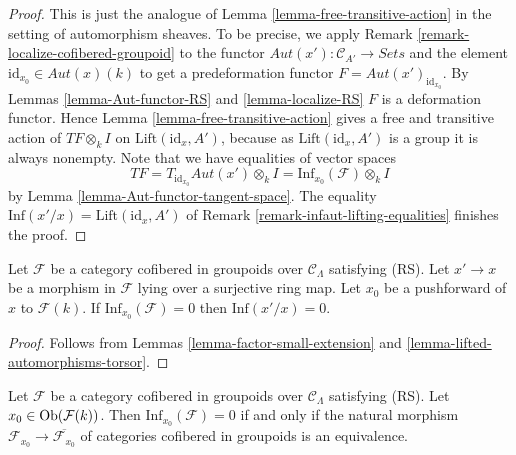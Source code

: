 \begin{proof}
This is just the analogue of
Lemma \ref{lemma-free-transitive-action}
in the setting of automorphism sheaves.
To be precise, we apply
Remark \ref{remark-localize-cofibered-groupoid}
to the functor $\mathit{Aut}(x') : \mathcal{C}_{A'} \to \textit{Sets}$
and the element $\text{id}_{x_0} \in \mathit{Aut}(x)(k)$ to get
a predeformation functor $F = \mathit{Aut}(x')_{\text{id}_{x_0}}$. By
Lemmas \ref{lemma-Aut-functor-RS} and \ref{lemma-localize-RS}
$F$ is a deformation functor. Hence
Lemma \ref{lemma-free-transitive-action}
gives a free and transitive action
of $TF \otimes_k I$ on $\text{Lift}(\text{id}_x, A')$, because as
$\text{Lift}(\text{id}_x, A')$ is a group it is always nonempty.
Note that we have equalities of vector spaces
$$
TF = T_{\text{id}_{x_0}} \mathit{Aut}(x') \otimes_k I =
\text{Inf}_{x_0}(\mathcal{F}) \otimes_k I
$$
by
Lemma \ref{lemma-Aut-functor-tangent-space}.
The equality $\text{Inf}(x'/x) = \text{Lift}(\text{id}_x, A')$ of
Remark \ref{remark-infaut-lifting-equalities}
finishes the proof.
\end{proof}

\begin{lemma}
\label{lemma-infaut-trivial}
Let $\mathcal{F}$ be a category cofibered in groupoids over
$\mathcal{C}_\Lambda$ satisfying (RS). Let $x' \to x$ be a morphism
in $\mathcal{F}$ lying over a surjective ring map. Let $x_0$ be a pushforward
of $x$ to $\mathcal{F}(k)$. If $\text{Inf}_{x_0}(\mathcal{F}) = 0$ then
$\text{Inf}(x'/x) = 0$.
\end{lemma}

\begin{proof}
Follows from
Lemmas \ref{lemma-factor-small-extension} and
\ref{lemma-lifted-automorphisms-torsor}.
\end{proof}

\begin{lemma}
\label{lemma-infdef-trivial}
Let $\mathcal{F}$ be a category cofibered in groupoids over
$\mathcal{C}_\Lambda$ satisfying (RS). Let
$x_0 \in \mathop{\rm Ob}\nolimits(\mathcal{F}(k))$. Then $\text{Inf}_{x_0}(\mathcal{F}) = 0$
if and only if the natural morphism
$\mathcal{F}_{x_0} \to \overline{\mathcal{F}_{x_0}}$ of
categories cofibered in groupoids is an equivalence.
\end{lemma}

